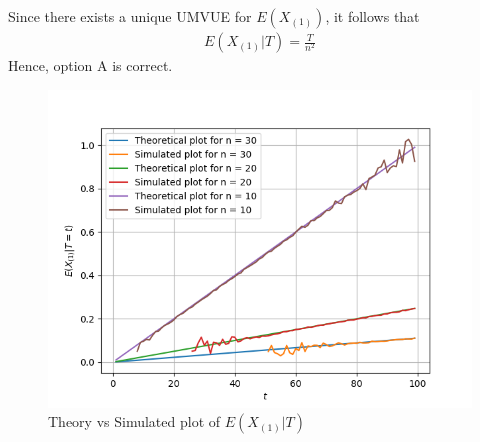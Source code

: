 Since there exists a unique UMVUE for $E(X_{(1)})$, it follows that 
\begin{align}
E(X_{(1)} | T) = \frac{T}{n^2}
\end{align}
Hence, option A is correct.
\begin{figure}[!hbt]
    \centering
	\includegraphics[width=\columnwidth]{stats/solutions/2/Figures/Figure_1.png}
    \caption{Theory vs Simulated plot of $E(X_{(1)} |T)$}
    \label{stats/2/CDF_Y}
\end{figure}
